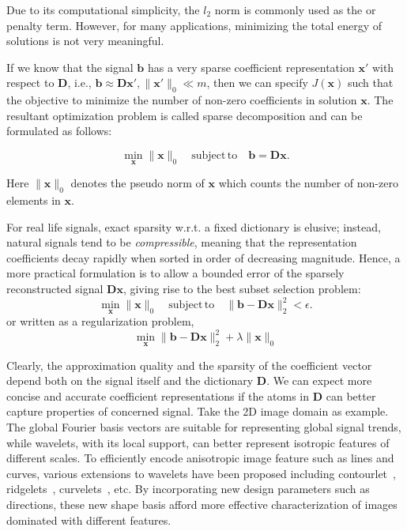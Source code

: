 Due to its computational simplicity, the $l_2$ norm is commonly used as the or penalty term. However, for
many applications, minimizing the total energy of solutions is not very meaningful.

If we know that the signal $\mathbf{b}$ has a very sparse coefficient representation $\mathbf{x'}$ with respect
to $\mathbf{D}$, i.e., $ \mathbf{b} \approx \mathbf{D}\mathbf{x'}, \|\mathbf{x'}\|_0 \ll m$,
then we can specify $J(\mathbf{x})$ such that the objective to minimize the number of non-zero coefficients
in solution $\mathbf{x}$. The resultant optimization problem is called sparse decomposition and can be
formulated as follows:

\begin{equation}
\label{eq:sparse-decompose}
\min_\mathbf{x} \|\mathbf{x}\|_0 \quad \mathrm{subject\,to} \quad \mathbf{b}=\mathbf{D}\mathbf{x}.
\end{equation}

Here $\|\mathbf{x}\|_0$ denotes the pseudo norm of $\mathbf{x}$ which counts the number
of non-zero elements in $\mathbf{x}$.

For real life signals, exact sparsity w.r.t. a fixed dictionary is elusive; instead, natural
signals tend to be \emph{compressible}, meaning that the representation coefficients decay rapidly
when sorted in order of decreasing magnitude. Hence, a more practical formulation is to allow a bounded
error of the sparsely reconstructed signal $\mathbf{D}\mathbf{x}$, giving rise to the best
subset selection problem:
\begin{equation}
\label{eq:sparse-approx}
\min_\mathbf{x} \|\mathbf{x}\|_0 \quad \mathrm{subject\,to} \quad \|\mathbf{b}-\mathbf{D}\mathbf{x}\|_2^2<\epsilon.
\end{equation}
or written as a regularization problem,
\begin{equation}
\label{eq:regularized-sparse-approx}
\min_\mathbf{x}  \|\mathbf{b}-\mathbf{D}\mathbf{x}\|_2^2 + \lambda \|\mathbf{x}\|_0
\end{equation}

Clearly, the approximation quality and the sparsity of the coefficient vector depend both on the signal itself
and the dictionary $\mathbf{D}$. We can expect more concise and accurate coefficient representations if the atoms
in $\mathbf{D}$ can better capture properties of concerned signal. Take the 2D image domain as example. The global
Fourier basis vectors are suitable for representing global signal trends, while wavelets, with its local support,
can better represent isotropic features of different scales. To efficiently encode anisotropic image feature
such as lines and curves, various extensions to wavelets have been proposed
including contourlet~\cite{Do2005}, ridgelets~\cite{Emmanuel1999}, curvelets~\cite{Candes1999}, etc. By incorporating
new design parameters such as directions, these new shape basis afford more effective characterization of images
dominated with different features.

